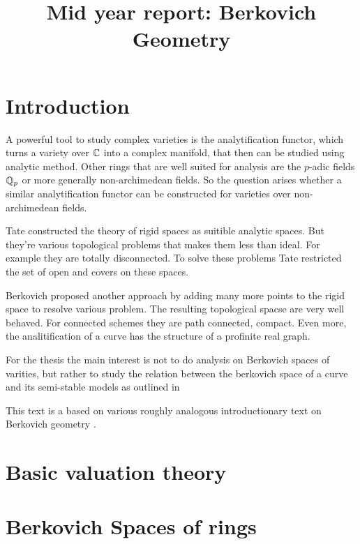 \documentclass[a4paper]{article}
\title{Mid year report: Berkovich Geometry}
\begin{document}
\maketitle

\tableofcontents

\pagebreak

\section{Introduction} \label{sec:introduction}

A powerful tool to study complex varieties is the analytification functor, which turns a variety over $\mathbb{C}$ into a complex manifold, that then can be studied using analytic method. 
Other rings that are well suited for analysis are the $p$-adic fields $\mathbb{Q}_p$ or more generally non-archimedean fields. 
So the question arises whether a similar analytification functor can be constructed for  varieties over non-archimedean fields. 

Tate constructed the theory of rigid spaces as suitible analytic spaces. But they're various topological problems that makes them less than ideal. For example they are totally disconnected. To solve these problems Tate restricted the set of open and covers on these spaces. 

Berkovich proposed another approach by adding many more points to the rigid space to resolve various problem. 
The resulting topological spacse are very well behaved. For connected schemes they are path connected, compact. Even more, the analitification of a curve has the structure of a profinite real graph. 

For the thesis the main interest is not to do analysis on Berkovich spaces of varities, but rather to study the relation between the berkovich space of a curve and its semi-stable models as outlined in \cite{bakerStructureNonarchimedeanAnalytic2013}

This text is a based on various roughly analogous introductionary text on Berkovich geometry \cite{bakerarizona,temkinIntroductionBerkovichAnalytic2010,nicaiseNONARCHIMEDEANGEOMETRY,boschLecturesFormalRigid2014}. 

\section{Basic valuation theory} \label{sec:basic_valuation_theory}



\section{Berkovich Spaces of rings} \label{sec:berkovich_spaces}

\end{document}
